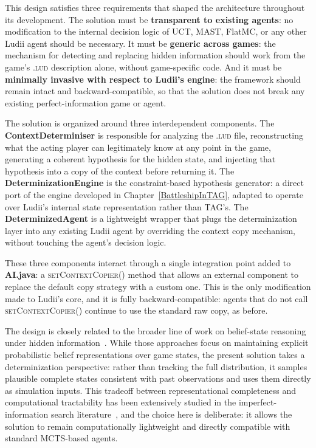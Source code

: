 This design satisfies three requirements that shaped the architecture throughout its development. The solution must be \textbf{transparent to existing agents}: no modification to the internal decision logic of UCT, MAST, FlatMC, or any other Ludii agent should be necessary. It must be \textbf{generic across games}: the mechanism for detecting and replacing hidden information should work from the game's \textsc{.lud} description alone, without game-specific code. And it must be \textbf{minimally invasive with respect to Ludii's engine}: the framework should remain intact and backward-compatible, so that the solution does not break any existing perfect-information game or agent.

The solution is organized around three interdependent components. The \textbf{ContextDeterminiser} is responsible for analyzing the \textsc{.lud} file, reconstructing what the acting player can legitimately know at any point in the game, generating a coherent hypothesis for the hidden state, and injecting that hypothesis into a copy of the context before returning it. The \textbf{DeterminizationEngine} is the constraint-based hypothesis generator: a direct port of the engine developed in Chapter~\ref{BattleshipInTAG}, adapted to operate over Ludii's internal state representation rather than TAG's. The \textbf{DeterminizedAgent} is a lightweight wrapper that plugs the determinization layer into any existing Ludii agent by overriding the context copy mechanism, without touching the agent's decision logic.

These three components interact through a single integration point added to \textbf{AI.java}: a \textsc{setContextCopier()} method that allows an external component to replace the default copy strategy with a custom one. This is the only modification made to Ludii's core, and it is fully backward-compatible: agents that do not call \textsc{setContextCopier()} continue to use the standard raw copy, as before.

The design is closely related to the broader line of work on belief-state reasoning under hidden information~\cite{morenville2024beliefsg,morenville2025belief_constraints}. While those approaches focus on maintaining explicit probabilistic belief representations over game states, the present solution takes a determinization perspective: rather than tracking the full distribution, it samples plausible complete states consistent with past observations and uses them directly as simulation inputs. This tradeoff between representational completeness and computational tractability has been extensively studied in the imperfect-information search literature~\cite{cowling2012information}, and the choice here is deliberate: it allows the solution to remain computationally lightweight and directly compatible with standard MCTS-based agents.


